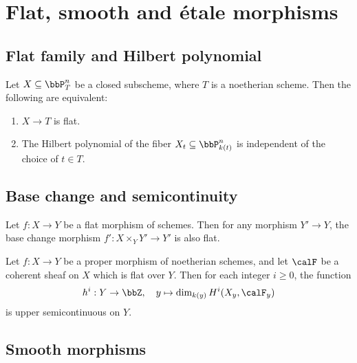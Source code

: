 \section{Flat, smooth and \'etale morphisms}


\subsection{Flat family and Hilbert polynomial}

    \begin{theorem}\label{thm:flat_iff_has_the_same_Hilbert_polynomials}
        Let \(X\subseteq \bbP^n_T\) be a closed subscheme, where \(T\) is a noetherian scheme. Then the following are equivalent:
        \begin{enumerate}
            \item \(X\to T\) is flat.
            \item The Hilbert polynomial of the fiber \(X_t\subseteq \bbP^n_{k(t)}\) is independent of the choice of \(t\in T\).
        \end{enumerate}
    \end{theorem}

\subsection{Base change and semicontinuity}

    \begin{theorem}
        Let \(f:X\to Y\) be a flat morphism of schemes. Then for any morphism \(Y'\to Y\), the base change morphism \(f':X\times_Y Y'\to Y'\) is also flat.
    \end{theorem}

    \begin{theorem}
        Let \(f:X\to Y\) be a proper morphism of noetherian schemes, and let \(\calF\) be a coherent sheaf on \(X\) which is flat over \(Y\). Then for each integer \(i\geq 0\), the function
        \[
            h^i:Y\to \bbZ, \quad y\mapsto \dim_{k(y)} H^i(X_y,\calF_y)
        \]
        is upper semicontinuous on \(Y\).
    \end{theorem}

\subsection{Smooth morphisms}

